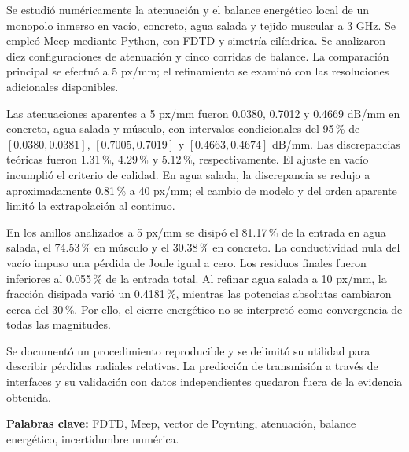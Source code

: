 Se estudió numéricamente la atenuación y el balance energético local de un monopolo inmerso en vacío, concreto, agua salada y tejido muscular a 3 GHz. Se empleó Meep mediante Python, con FDTD y simetría cilíndrica. Se analizaron diez configuraciones de atenuación y cinco corridas de balance. La comparación principal se efectuó a 5 px/mm; el refinamiento se examinó con las resoluciones adicionales disponibles.

Las atenuaciones aparentes a 5 px/mm fueron 0.0380, 0.7012 y 0.4669 dB/mm en concreto, agua salada y músculo, con intervalos condicionales del 95\,\% de $[0.0380,0.0381]$, $[0.7005,0.7019]$ y $[0.4663,0.4674]$ dB/mm. Las discrepancias teóricas fueron 1.31\,\%, 4.29\,\% y 5.12\,\%, respectivamente. El ajuste en vacío incumplió el criterio de calidad. En agua salada, la discrepancia se redujo a aproximadamente 0.81\,\% a 40 px/mm; el cambio de modelo y del orden aparente limitó la extrapolación al continuo.

En los anillos analizados a 5 px/mm se disipó el 81.17\,\% de la entrada en agua salada, el 74.53\,\% en músculo y el 30.38\,\% en concreto. La conductividad nula del vacío impuso una pérdida de Joule igual a cero. Los residuos finales fueron inferiores al 0.055\,\% de la entrada total. Al refinar agua salada a 10 px/mm, la fracción disipada varió un 0.4181\,\%, mientras las potencias absolutas cambiaron cerca del 30\,\%. Por ello, el cierre energético no se interpretó como convergencia de todas las magnitudes.

Se documentó un procedimiento reproducible y se delimitó su utilidad para describir pérdidas radiales relativas. La predicción de transmisión a través de interfaces y su validación con datos independientes quedaron fuera de la evidencia obtenida.

\noindent\textbf{Palabras clave:} FDTD, Meep, vector de Poynting, atenuación, balance energético, incertidumbre numérica.
